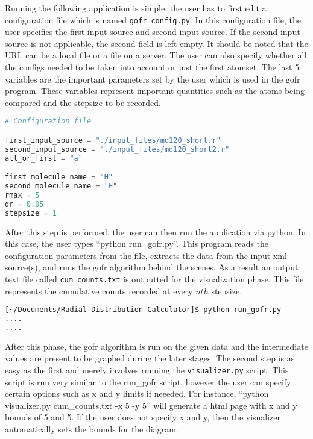 Running the following application is simple, the user has to first edit a configuration file which is named \verb|gofr_config.py|. In this configuration file, the user specifies the first input source and second input source. If the second input source is not applicable, the second field is left empty. It should be noted that the URL can be a local file or a file on a server. The user can also specify whether all the configs needed to be taken into account or just the first atomset. The last 5 variables are the important parameters set by the user which is used in the gofr program. These variables represent important quantities such as the atoms being compared and the stepsize to be recorded.



\begin{lstlisting}[language=Python, caption=Config file for setting parameters during the run.]
# Configuration file

first_input_source = "./input_files/md120_short.r"
second_input_source = "./input_files/md120_short2.r"
all_or_first = "a"

first_molecule_name = "H"
second_molecule_name = "H"
rmax = 5
dr = 0.05
stepsize = 1
\end{lstlisting}





After this step is performed, the user can then run the application via python. In this case, the user types ``python run_gofr.py''. This program reads the configuration parameters from the file, extracts the data from the input xml source(s), and runs the gofr algorithm behind the scenes. As a result an output text file called \verb|cum_counts.txt| is outputted for the visualization phase. This file represents the cumulative counts recorded at every $nth$ stepsize. 


\begin{lstlisting}[language=bash, caption=Running the script.]
[~/Documents/Radial-Distribution-Calculator]$ python run_gofr.py
....
....
\end{lstlisting}

After this phase, the gofr algorithm is run on the given data and the intermediate values are present to be graphed during the later stages. The second step is as easy as the first and merely involves running the \verb|visualizer.py| script. This script is run very similar to the run_gofr script, however the user can specify certain options such as x and y limits if neeeded. For instance, ``python visualizer.py cum_counts.txt -x 5 -y 5'' will generate a html page with x and y bounds of 5 and 5. If the user does not specify x and y, then the visualizer automatically sets the bounds for the diagram.

